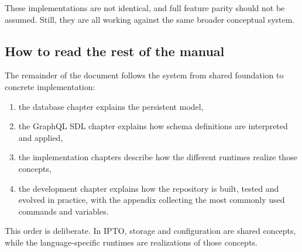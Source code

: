 These implementations are not identical, and full feature parity should not be assumed. Still, they are all working against the same broader conceptual system.

\subsection{How to read the rest of the manual}

The remainder of the document follows the system from shared foundation to concrete implementation:
\begin{enumerate}
\item the database chapter explains the persistent model,
\item the GraphQL SDL chapter explains how schema definitions are interpreted and applied,
\item the implementation chapters describe how the different runtimes realize those concepts,
\item the development chapter explains how the repository is built, tested and evolved in practice, with the appendix collecting the most commonly used commands and variables.
\end{enumerate}

This order is deliberate. In IPTO, storage and configuration are shared concepts, while the language-specific runtimes are realizations of those concepts.
